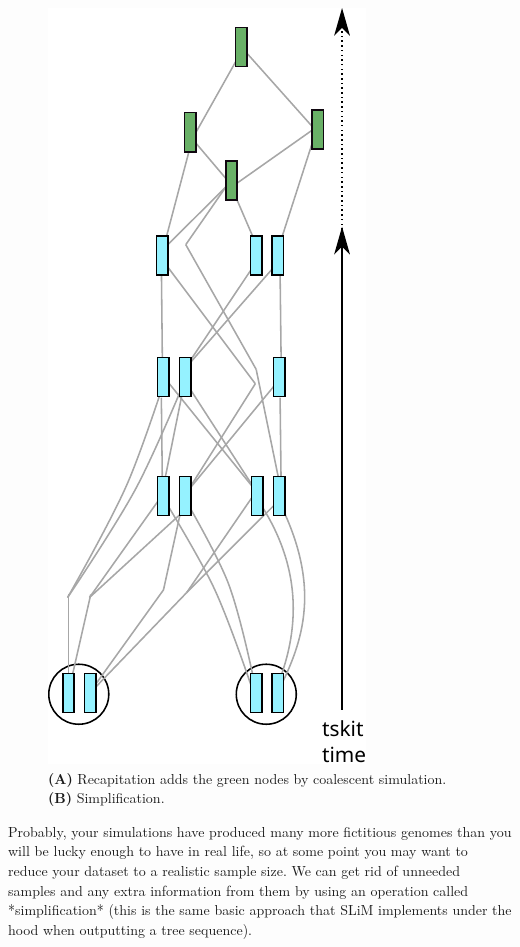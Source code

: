 \documentclass[12pt]{article}
\begin{document}
\begin{figure}
    \includegraphics{figures/pedigree_simplify}
\caption{
    \textbf{(A)} Recapitation adds the green nodes by coalescent simulation.
    \textbf{(B)} Simplification.
}
\label{fig:recap_simp}
\end{figure}


Probably, your simulations have produced many more fictitious genomes
than you will be lucky enough to have in real life,
so at some point you may want to reduce your dataset to a realistic sample size.
We can get rid of unneeded samples and any extra information from them by using
an operation called *simplification* (this is the same basic approach that SLiM
implements under the hood when outputting a tree sequence).
\end{document}
